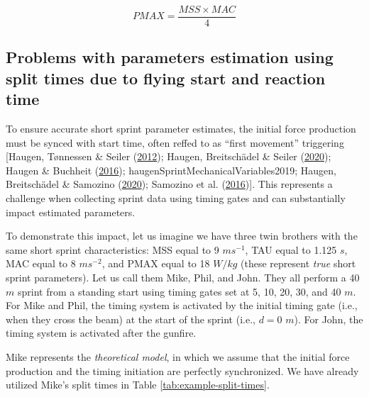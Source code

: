 \documentclass[fleqn,10pt]{wlpeerj} %
\begin{document}
\begin{equation}
  PMAX = \frac{MSS \times MAC}{4} \label{eq:relative-power}
\end{equation}

\hypertarget{problems-with-parameters-estimation-using-split-times-due-to-flying-start-and-reaction-time}{%
\subsection{Problems with parameters estimation using split times due to flying start and reaction time}\label{problems-with-parameters-estimation-using-split-times-due-to-flying-start-and-reaction-time}}

To ensure accurate short sprint parameter estimates, the initial force production must be synced with start time, often reffed to as ``first movement'' triggering {[}Haugen, Tønnessen \& Seiler (\protect\hyperlink{ref-haugenDifferenceStartImpact2012}{2012}); Haugen, Breitschädel \& Seiler (\protect\hyperlink{ref-haugenSprintMechanicalProperties2020}{2020}); Haugen \& Buchheit (\protect\hyperlink{ref-haugenSprintRunningPerformance2016}{2016}); haugenSprintMechanicalVariables2019; Haugen, Breitschädel \& Samozino (\protect\hyperlink{ref-haugenPowerForceVelocityProfilingSprinting2020}{2020}); Samozino et al. (\protect\hyperlink{ref-samozinoSimpleMethodMeasuring2016}{2016}){]}. This represents a challenge when collecting sprint data using timing gates and can substantially impact estimated parameters.

To demonstrate this impact, let us imagine we have three twin brothers with the same short sprint characteristics: MSS equal to 9 \(ms^{-1}\), TAU equal to 1.125 \(s\), MAC equal to 8 \(ms^{-2}\), and PMAX equal to 18 \(W/kg\) (these represent \emph{true} short sprint parameters). Let us call them Mike, Phil, and John. They all perform a 40 \(m\) sprint from a standing start using timing gates set at 5, 10, 20, 30, and 40 \(m\). For Mike and Phil, the timing system is activated by the initial timing gate (i.e., when they cross the beam) at the start of the sprint (i.e., \(d=0\) \(m\)). For John, the timing system is activated after the gunfire.

Mike represents the \emph{theoretical model}, in which we assume that the initial force production and the timing initiation are perfectly synchronized. We have already utilized Mike's split times in Table \ref{tab:example-split-times}.
\end{document}
